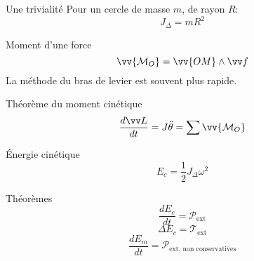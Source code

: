 \documentclass[french, a4paper, 11pt, twocolumn]{article}
\begin{document}
\begin{cadre}{Une trivialité}
  Pour un cercle de masse \(m\), de rayon \(R\):
  \[J_{\Delta} = mR^{2}\]
\end{cadre}

\begin{cadre}{Moment d'une force}
  \[\vv{\mathcal M_{O}} = \vv{OM}\wedge \vv f\]
  La méthode du bras de levier est souvent plus rapide.
\end{cadre}

\begin{cadre}{Théorème du moment cinétique}
  \[\dfrac{d\vv L}{dt}=J\ddot\theta=\sum\vv{\mathcal M_{O}}\]
\end{cadre}

\begin{cadre}{Énergie cinétique}
  \[E_{c} = \dfrac{1}{2}J_{\Delta}\omega^{2}\]
\end{cadre}

\begin{cadre}{Théorèmes}
  \[\dfrac{dE_{c}}{dt}=\mathcal P_{\mathrm{ext}}\]
  \[\Delta E_{c}=\mathcal T_{\mathrm{ext}}\]
  \[\dfrac{dE_{m}}{dt}=\mathcal P_{\text{ext, non conservatives}}\]
\end{cadre}
\end{document}

